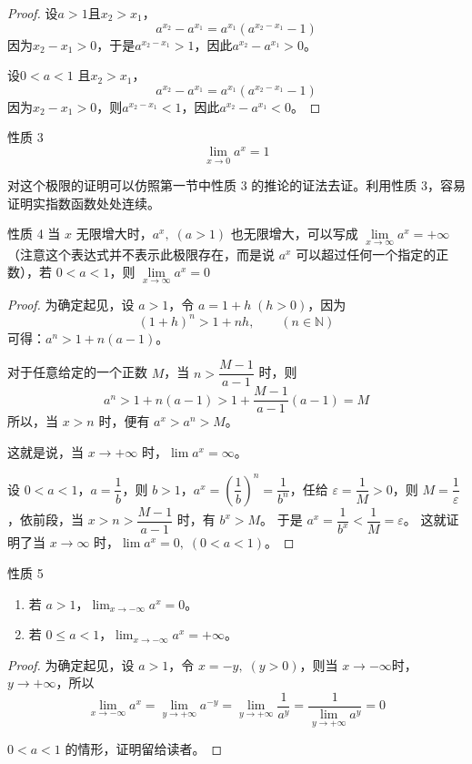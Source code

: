 \begin{proof}
设$a>1$且$x_2>x_1$，
\[a^{x_2}-a^{x_1}=a^{x_1}\left(a^{x_2-x_1}-1\right)\]
因为$x_2-x_1>0$，于是$a^{x_2-x_1}>1$，因此$a^{x_2}-a^{x_1}>0$。

设$0<a<1$ 且$x_2>x_1$，
\[a^{x_2}-a^{x_1}=a^{x_1}\left(a^{x_2-x_1}-1\right)\]
因为$x_2-x_1>0$，则$a^{x_2-x_1}<1$，因此$a^{x_2}-a^{x_1}<0$。  
\end{proof}

\begin{Theorem}{性质 3}
\[\lim_{x\to 0} a^x=1\]
\end{Theorem}


对这个极限的证明可以仿照第一节中性质 3 的推论的证法去证。利用性质 3，容易证明实指数函数处处连续。

\begin{Theorem}{性质 4}
当 $x$ 无限增大时，$a^x,\; (a>1)$ 也无限增大，可以写成 $\lim\limits_{x\to\infty} a^x=+\infty$ （注意这个表达式并不表示此极限存在，而是说 $a^x$ 可以超过任何一个指定的正数），若 $0<a<1$，则 $\lim\limits_{x\to\infty} a^x=0$
\end{Theorem}

\begin{proof}
  为确定起见，设 $a>1$，令 $a=1+h\; (h>0)$，因为
\[(1+h)^n>1+nh,\qquad (n\in\mathbb{N})\]
可得：$a^n>1+n(a-1)$。

对于任意给定的一个正数 $M$，当 $n>\dfrac{M-1}{a-1}$ 时，则
\[a^n>1+n(a-1)>1+\frac{M-1}{a-1}(a-1)=M\]
所以，当 $x>n$ 时，便有 $a^x>a^n>M$。

这就是说，当 $x\to +\infty$ 时，$\lim a^x=\infty$。

设 $0<a<1$，$a=\dfrac{1}{b}$，则 $b>1$，$a^x=\left(\dfrac{1}{b}\right)^n=\dfrac{1}{b^n}$，任给 $\varepsilon=\dfrac{1}{M}>0$，则 $M=\dfrac{1}{\varepsilon}$，依前段，当 $x>n>\dfrac{M-1}{a-1}$ 时，有 $b^x>M$。 于是 $a^x=\dfrac{1}{b^x}<\dfrac{1}{M}=\varepsilon$。 这就证明了当 $x\to\infty$ 时，$\lim a^x=0,\; (0<a<1)$。
\end{proof}

\begin{Theorem}{性质 5}
\begin{enumerate}
  \item 若 $a>1$，$\lim_{x\to-\infty} a^x=0$。
  \item 若 $0\leqslant a<1$，$\lim_{x\to-\infty} a^x=+\infty$。
\end{enumerate}  
\end{Theorem}

\begin{proof}
为确定起见，设 $a>1$，令 $x=-y,\; (y>0)$，则当
$x\to-\infty$时，$y\to +\infty$，所以
\[\lim_{x\to-\infty} a^x=\lim_{y\to +\infty} a^{-y}=\lim_{y\to +\infty}\frac{1}{a^y}=\frac{1}{\lim\limits_{y\to +\infty}a^y}=0\]

$0<a<1$ 的情形，证明留给读者。
\end{proof}

